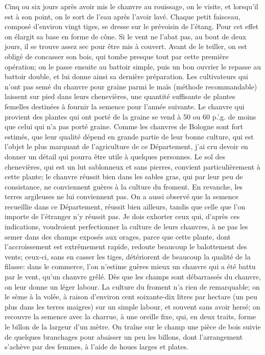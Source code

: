 Cinq ou six jours après avoir mis le chanvre au rouissage, on le visite, et lorsqu'il est à son point, on le sort de l'eau après l'avoir lavé. Chaque petit faisceau, composé d'environ vingt tiges, se dresse sur le prévoisin de l'étang. Pour cet effet on élargit sa base en forme de cône. Si le vent ne l'abat pas, au bout de deux jours, il se trouve assez sec pour être mis à couvert. Avant de le teiller, on est obligé de concasser son bois, qui tombe presque tout par cette première opération; on le passe ensuite au battoir simple, puis un bon ouvrier le repasse au\setcounter{page}{173} battoir double, et lui donne ainsi sa dernière préparation. Les cultivateurs qui n'ont pas semé du chanvre pour graine parmi le maïs (méthode recommandable) laissent sur pied dans leurs chenevières, une quantité suffisante de plantes femelles destinées à fournir la semence pour l'année suivante. Le chanvre qui provient des plantes qui ont porté de la graine se vend à 50 ou 60 p.'.g. de moins que celui qui n'a pas porté graine.
Comme les chanvres de Bologne sont fort estimés, que leur qualité dépend en grande partie de leur bonne culture, qui est l'objet le plus marquant de l'agriculture de ce Département, j'ai cru devoir en donner un détail qui pourra être utile à quelques personnes. Le sol des chenevières, qui est un lut sablonneux et sans pierres, convient particulièrement à cette plante; le chanvre réussit bien dans les sables gras, qui par leur peu de consistance, ne conviennent guères à la culture du froment. En revanche, les terres argileuses ne lui conviennent pas. On a aussi observé que la semence recueillie dans ce Département, réussit bien ailleurs, tandis que celle que l'on importe de l'étranger n'y réussit pas. Je dois exhorter ceux qui, d'après ces indications, voudroient perfectionner la culture de leurs chanvres, à ne pas\setcounter{page}{174} les semer dans des champs exposés aux orages, parce que cette plante, dont l'accroissement est extrêmement rapide, redoute beaucoup le balottement des vents; ceux-ci, sans en casser les tiges, détériorent de beaucoup la qualité de la filasse: dans le commerce, l'on n'estime guères mieux un chanvre qui a été battu par le vent, qu'un chanvre grêlé.
Dès que les champs sont débarrassés du chanvre, on leur donne un léger labour.
La culture du froment n'a rien de remarquable; on le sème à la volée, à raison d'environ cent soixante-dix litres par hectare (un peu plus dans les terres maigres) sur un simple labour, et souvent sans avoir hersé; on recouvre la semence avec la charrue, à une oreille fixe, qui, en deux traits, forme le billon de la largeur d'un mètre. On traîne sur le champ une pièce de bois suivie de quelques branchages pour abaisser un peu les billons, dont l'arrangement s'achève par des femmes, à l'aide de houes larges et plates.
